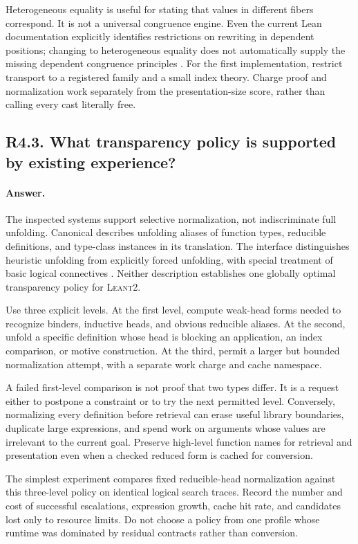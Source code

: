 \documentclass[11pt,a4paper]{article}
\newcommand{\code}[1]{\texttt{\detokenize{#1}}}
\newcommand{\repo}{\textsc{Leant2}}
\newcommand{\answer}{\paragraph{Answer.}}
\theoremstyle{definition}
\theoremstyle{remark}
\begin{document}
Heterogeneous equality is useful for stating that values in different fibers
correspond. It is not a universal congruence engine. Even the current Lean
\code{cbv} documentation explicitly identifies restrictions on rewriting in
dependent positions; changing to heterogeneous equality does not automatically
supply the missing dependent congruence principles \cite{leantactics}.
For the first implementation, restrict transport to a registered family and a
small index theory. Charge proof and normalization work separately from the
presentation-size score, rather than calling every cast literally free.

\subsection{R4.3. What transparency policy is supported by existing experience?}
\answer The inspected systems support selective normalization, not indiscriminate
full unfolding. Canonical describes unfolding aliases of function types,
reducible definitions, and type-class instances in its translation. The
\code{sauto} interface distinguishes heuristic unfolding from explicitly forced
unfolding, with special treatment of basic logical connectives
\cite{canonical,sauto}. Neither description establishes one globally optimal
transparency policy for \repo{}.

Use three explicit levels. At the first level, compute weak-head forms needed to
recognize binders, inductive heads, and obvious reducible aliases. At the second,
unfold a specific definition whose head is blocking an application, an index
comparison, or motive construction. At the third, permit a larger but bounded
normalization attempt, with a separate work charge and cache namespace.

A failed first-level comparison is not proof that two types differ. It is a
request either to postpone a constraint or to try the next permitted level.
Conversely, normalizing every definition before retrieval can erase useful
library boundaries, duplicate large expressions, and spend work on arguments
whose values are irrelevant to the current goal. Preserve high-level function
names for retrieval and presentation even when a checked reduced form is cached
for conversion.

The simplest experiment compares fixed reducible-head normalization against this
three-level policy on identical logical search traces. Record the number and
cost of successful escalations, expression growth, cache hit rate, and candidates
lost only to resource limits. Do not choose a policy from one profile whose
runtime was dominated by residual contracts rather than conversion.
\end{document}
